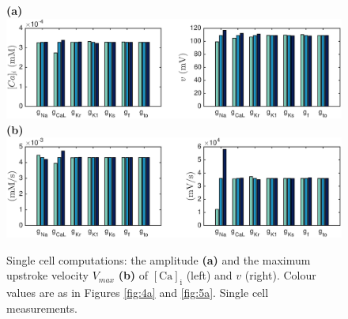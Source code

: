 \documentclass{article}
\begin{document}
\begin{figure}
 \textbf{(a)}  \includegraphics[trim=1cm 0cm 2cm 0cm, clip=true, width=1\linewidth]{sc_amplitude} 
 \textbf{(b)}  \includegraphics[trim=1cm 0cm 2cm 0cm, clip=true, width=1\linewidth]{sc_v_max} 
    \caption{Single cell computations: the amplitude \textbf{(a)} and the maximum upstroke velocity $V_{max}$ \textbf{(b)} of $[\mathrm{Ca}]_{\mathrm{i}}$ (left) and $v$ (right).  Colour values are as in Figures \ref{fig:4a} and \ref{fig:5a}. Single cell measurements.}
    \label{fig:6a}
\end{figure}
%
\end{document}
